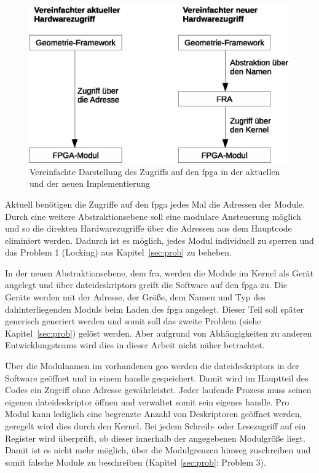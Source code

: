 \begin{figure}[!hbtp]
	\centering
	\includegraphics[width = 0.9\linewidth]{pictures/2020-01-16_ImplementierungNewvsOld.eps}
	\smallskip
	\caption{Vereinfachte Darstellung des Zugriffs auf den \ac{fpga} in der aktuellen und der neuen Implementierung}
	\label{fig:newvsold}
\end{figure} 



Aktuell benötigen die Zugriffe auf den \ac{fpga} jedes Mal die Adressen der Module. Durch eine weitere Abstraktionsebene soll eine modulare Ansteuerung möglich und so die direkten Hardwarezugriffe über die Adressen aus dem Hauptcode eliminiert werden. Dadurch ist es möglich, jedes Modul individuell zu sperren und das Problem 1 (Locking) aus Kapitel~\ref{sec:prob} zu beheben.


In der neuen Abstraktionsebene, dem \ac{fra}, werden die Module im Kernel als Gerät angelegt und über \glspl{dateideskriptor} greift die Software auf den \ac{fpga} zu. Die Geräte werden mit der Adresse, der Größe, dem Namen und Typ des dahinterliegenden Moduls beim Laden des \ac{fpga} angelegt. Dieser Teil soll später generisch generiert werden und somit soll das zweite Problem (siehe Kapitel~\ref{sec:prob}) gelöst werden. Aber aufgrund von Abhängigkeiten zu anderen Entwicklungsteams wird dies in dieser Arbeit nicht näher betrachtet.



Über die Modulnamen im vorhandenen \ac{geo} werden die \glspl{dateideskriptor} in der Software geöffnet und in einem \gls{handle} gespeichert. Damit wird im Hauptteil des Codes ein Zugriff ohne Adresse gewährleistet. Jeder laufende Prozess muss seinen eigenen \gls{dateideskriptor} öffnen und verwaltet somit sein eigenes \gls{handle}. Pro Modul kann lediglich eine begrenzte Anzahl von Deskriptoren geöffnet werden, geregelt wird dies durch den Kernel. 
Bei jedem Schreib- oder Lesezugriff auf ein Register wird überprüft, ob dieser innerhalb der angegebenen Modulgröße liegt. Damit ist es nicht mehr möglich, über die Modulgrenzen hinweg zuschreiben und somit falsche Module zu beschreiben (Kapitel~\ref{sec:prob}: Problem 3).




